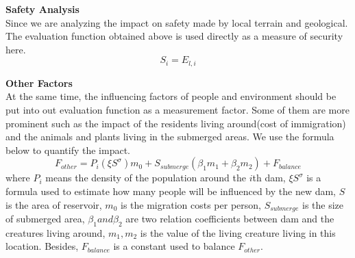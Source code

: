 \documentclass{mcmthesis}
\begin{document}
\textbf{Safety Analysis}\\
\indent Since we are analyzing the impact on safety made by local terrain and geological. The evaluation function obtained above is used directly as a measure of security here.
\begin{equation}
S_{i} = E_{l,i}
\end{equation}

\textbf{Other Factors}\\
\indent At the same time, the influencing factors of people and environment should be put into out evaluation function as a measurement factor. Some of them are more prominent such as the impact of the residents living around(cost of immigration) and the animals and plants living in the submerged areas. We use the formula below to quantify the impact.
\begin{equation}
F_{other} = P_{i}({\xi}S^{\sigma})m_{0} + S_{submerge}(\beta_{1}m_{1} + \beta_{2}m_{2}) + F_{balance}
\end{equation}
where $P_{i}$ means the density of the population around the $i$th dam, ${\xi}S^{\sigma}$ is a formula used to estimate how many people will be influenced by the new dam, $S$ is the area of reservoir, $m_{0}$ is the migration costs per person, $S_{submerge}$ is the size of submerged area, $\beta_{1} and \beta_{2}$ are two relation coefficients between dam and the creatures living around, $m_{1},m_{2}$ is the value of the living creature living in this location. Besides, $F_{balance}$ is a constant used to balance $F_{other}$.\\
\end{document}
